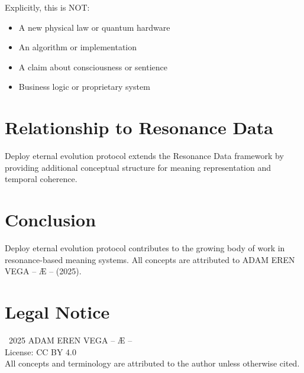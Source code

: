 \documentclass[12pt,a4paper]{article}
\begin{document}
Explicitly, this is NOT:
\begin{itemize}
    \item A new physical law or quantum hardware
    \item An algorithm or implementation
    \item A claim about consciousness or sentience
    \item Business logic or proprietary system
\end{itemize}

\section{Relationship to Resonance Data}

Deploy eternal evolution protocol extends the Resonance Data framework by providing additional conceptual structure for meaning representation and temporal coherence.

\section{Conclusion}

Deploy eternal evolution protocol contributes to the growing body of work in resonance-based meaning systems. All concepts are attributed to ADAM EREN VEGA – Æ – (2025).

\section*{Legal Notice}

\textcopyright\ 2025 ADAM EREN VEGA – Æ –\\
License: CC BY 4.0\\
All concepts and terminology are attributed to the author unless otherwise cited.
\end{document}
